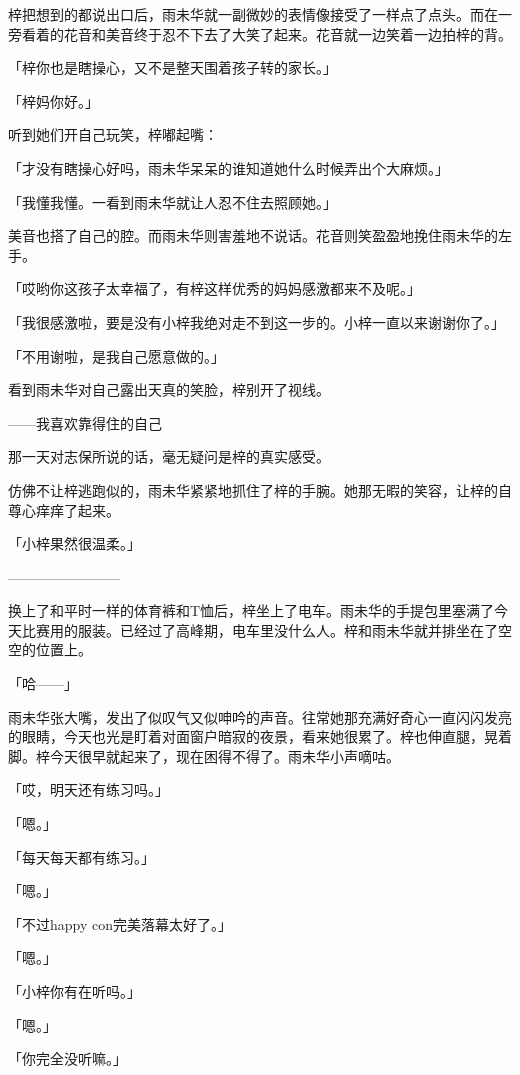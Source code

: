 \documentclass[UTF8]{ctexart}
\begin{document}
    梓把想到的都说出口后，雨未华就一副微妙的表情像接受了一样点了点头。而在一旁看着的花音和美音终于忍不下去了大笑了起来。花音就一边笑着一边拍梓的背。

    「梓你也是瞎操心，又不是整天围着孩子转的家长。」

    「梓妈你好。」

    听到她们开自己玩笑，梓嘟起嘴：

    「才没有瞎操心好吗，雨未华呆呆的谁知道她什么时候弄出个大麻烦。」

    「我懂我懂。一看到雨未华就让人忍不住去照顾她。」

    美音也搭了自己的腔。而雨未华则害羞地不说话。花音则笑盈盈地挽住雨未华的左手。

    「哎哟你这孩子太幸福了，有梓这样优秀的妈妈感激都来不及呢。」

    「我很感激啦，要是没有小梓我绝对走不到这一步的。小梓一直以来谢谢你了。」

    「不用谢啦，是我自己愿意做的。」

    看到雨未华对自己露出天真的笑脸，梓别开了视线。

    ——我喜欢靠得住的自己

    那一天对志保所说的话，毫无疑问是梓的真实感受。

    仿佛不让梓逃跑似的，雨未华紧紧地抓住了梓的手腕。她那无暇的笑容，让梓的自尊心痒痒了起来。

    「小梓果然很温柔。」

    ————————

    换上了和平时一样的体育裤和T恤后，梓坐上了电车。雨未华的手提包里塞满了今天比赛用的服装。已经过了高峰期，电车里没什么人。梓和雨未华就并排坐在了空空的位置上。

    「哈——」

    雨未华张大嘴，发出了似叹气又似呻吟的声音。往常她那充满好奇心一直闪闪发亮的眼睛，今天也光是盯着对面窗户暗寂的夜景，看来她很累了。梓也伸直腿，晃着脚。梓今天很早就起来了，现在困得不得了。雨未华小声嘀咕。

    「哎，明天还有练习吗。」

    「嗯。」

    「每天每天都有练习。」

    「嗯。」

    「不过happy con完美落幕太好了。」

    「嗯。」

    「小梓你有在听吗。」

    「嗯。」

    「你完全没听嘛。」
\end{document}
